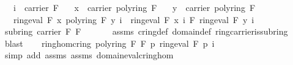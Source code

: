 \begin{isabellebody}
\ \ \ {\isachardoublequoteopen}i\ {\isasymin}\ carrier\ F{\isachardoublequoteclose}\isanewline
\ \ \ {\isachardoublequoteopen}x\ {\isasymin}\ carrier\ {\isacharparenleft}{\kern0pt}poly{\isacharunderscore}{\kern0pt}ring\ F{\isacharparenright}{\kern0pt}{\isachardoublequoteclose}\isanewline
\ \ \ {\isachardoublequoteopen}y\ {\isasymin}\ carrier\ {\isacharparenleft}{\kern0pt}poly{\isacharunderscore}{\kern0pt}ring\ F{\isacharparenright}{\kern0pt}{\isachardoublequoteclose}\isanewline
\ \ \ {\isachardoublequoteopen}ring{\isachardot}{\kern0pt}eval\ F\ {\isacharparenleft}{\kern0pt}x\ {\isasymominus}\isactrlbsub poly{\isacharunderscore}{\kern0pt}ring\ F\isactrlesub \ y{\isacharparenright}{\kern0pt}\ i\ {\isacharequal}{\kern0pt}\ ring{\isachardot}{\kern0pt}eval\ F\ x\ i\ {\isasymominus}\isactrlbsub F\isactrlesub \ ring{\isachardot}{\kern0pt}eval\ F\ y\ i{\isachardoublequoteclose}\isanewline
%
\isadelimproof
%
\endisadelimproof
%
\isatagproof
{}\isamarkupfalse%
\ {\isacharminus}{\kern0pt}\isanewline
\ \ \isamarkupfalse%
\ {\isachardoublequoteopen}subring\ {\isacharparenleft}{\kern0pt}carrier\ F{\isacharparenright}{\kern0pt}\ F{\isachardoublequoteclose}\ \isanewline
\ \ \ \ \isamarkupfalse%
\ assms{\isacharparenleft}{\kern0pt}{}{\isacharparenright}{\kern0pt}\ cring{\isacharunderscore}{\kern0pt}def\ domain{\isacharunderscore}{\kern0pt}def\ ring{\isachardot}{\kern0pt}carrier{\isacharunderscore}{\kern0pt}is{\isacharunderscore}{\kern0pt}subring\ \isamarkupfalse%
\ blast\isanewline
\ \ \isamarkupfalse%
\ {\isachardoublequoteopen}ring{\isacharunderscore}{\kern0pt}hom{\isacharunderscore}{\kern0pt}cring\ {\isacharparenleft}{\kern0pt}poly{\isacharunderscore}{\kern0pt}ring\ F{\isacharparenright}{\kern0pt}\ F\ {\isacharparenleft}{\kern0pt}{\isasymlambda}p{\isachardot}{\kern0pt}\ {\isacharparenleft}{\kern0pt}ring{\isachardot}{\kern0pt}eval\ F\ p{\isacharparenright}{\kern0pt}\ i{\isacharparenright}{\kern0pt}{\isachardoublequoteclose}\isanewline
\ \ \ \ \isamarkupfalse%
\ {\isacharparenleft}{\kern0pt}simp\ add{\isacharcolon}{\kern0pt}\ assms{\isacharparenleft}{\kern0pt}{}{\isacharparenright}{\kern0pt}\ assms{\isacharparenleft}{\kern0pt}{}{\isacharparenright}{\kern0pt}\ domain{\isachardot}{\kern0pt}eval{\isacharunderscore}{\kern0pt}cring{\isacharunderscore}{\kern0pt}hom{\isacharparenright}{\kern0pt}\isanewline
\ \ \isamarkupfalse%
\ \isamarkupfalse%

\end{isabellebody}
